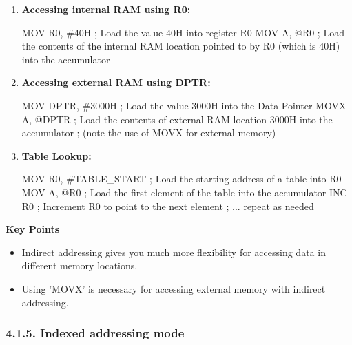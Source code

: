 \documentclass[
]{article}
\newenvironment{Shaded}{}{}
\newcommand{\NormalTok}[1]{#1}
\begin{document}
\begin{enumerate}
\def\labelenumi{\arabic{enumi}.}
\item
  \textbf{Accessing internal RAM using R0:}

\begin{Shaded}
\begin{Highlighting}[]
\NormalTok{MOV R0, \#40H  ; Load the value 40H into register R0}
\NormalTok{MOV A, @R0    ; Load the contents of the internal RAM location pointed to by R0 (which is 40H) into the accumulator}
\end{Highlighting}
\end{Shaded}
\item
  \textbf{Accessing external RAM using DPTR:}

\begin{Shaded}
\begin{Highlighting}[]
\NormalTok{MOV DPTR, \#3000H  ; Load the value 3000H into the Data Pointer}
\NormalTok{MOVX A, @DPTR     ; Load the contents of external RAM location 3000H into the accumulator}
\NormalTok{                      ; (note the use of MOVX for external memory)}
\end{Highlighting}
\end{Shaded}
\item
  \textbf{Table Lookup:}

\begin{Shaded}
\begin{Highlighting}[]
\NormalTok{MOV R0, \#TABLE\_START  ; Load the starting address of a table into R0}
\NormalTok{MOV A, @R0            ; Load the first element of the table into the accumulator}
\NormalTok{INC R0                ; Increment R0 to point to the next element}
\NormalTok{; ... repeat as needed}
\end{Highlighting}
\end{Shaded}
\end{enumerate}

\textbf{Key Points}

\begin{itemize}
\item
  Indirect addressing gives you much more flexibility for accessing data
  in different memory locations.
\item
  Using 'MOVX' is necessary for accessing external memory with indirect
  addressing.
\end{itemize}

\hypertarget{415-indexed-addressing-mode}{%
\subsubsection{4.1.5. Indexed addressing
mode}\label{415-indexed-addressing-mode}}
\end{document}
